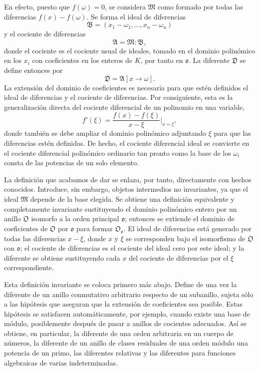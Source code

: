En efecto, puesto que $f(\omega)=0$, se considera $\mathfrak M$ como formado por todas las diferencias $f(x)-f(\omega)$. Se forma el ideal de diferencias
\[
        \mathfrak B=(x_1-\omega_1,\ldots,x_n-\omega_n)
\]
y el cociente de diferencias
\[
        \mathfrak A=\mathfrak M:\mathfrak B,
\]
donde el cociente es el cociente usual de ideales, tomado en el dominio polinómico en los $x_i$ con coeficientes en los enteros de $K$, por tanto en $\mathfrak o$. La diferente $\mathfrak D$ se define entonces por
\[
        \mathfrak D=\mathfrak A[x\to\omega].
\]
La extensión del dominio de coeficientes es necesaria para que estén definidos el ideal de diferencias y el cociente de diferencias. Por consiguiente, esta es la generalización directa del cociente diferencial de un polinomio en una variable,
\[
        f'(\xi)=\frac{f(x)-f(\xi)}{x-\xi}\bigg|_{x=\xi},
\]
donde también se debe ampliar el dominio polinómico adjuntando $\xi$ para que las diferencias estén definidas. De hecho, el cociente diferencial ideal se convierte en el cociente diferencial polinómico ordinario tan pronto como la base de los $\omega_i$ consta de las potencias de un solo elemento.

La definición que acabamos de dar se enlaza, por tanto, directamente con hechos conocidos. Introduce, sin embargo, objetos intermedios no invariantes, ya que el ideal $\mathfrak M$ depende de la base elegida. Se obtiene una definición equivalente y completamente invariante sustituyendo el dominio polinómico entero por un anillo $\mathfrak O$ isomorfo a la orden principal $\mathfrak o$; entonces se extiende el dominio de coeficientes de $\mathfrak O$ por $\mathfrak o$ para formar $\mathfrak O_{\mathfrak o}$. El ideal de diferencias está generado por todas las diferencias $x-\xi$, donde $x$ y $\xi$ se corresponden bajo el isomorfismo de $\mathfrak O$ con $\mathfrak o$; el cociente de diferencias es el cociente del ideal cero por este ideal; y la diferente se obtiene sustituyendo cada $x$ del cociente de diferencias por el $\xi$ correspondiente.

Esta definición invariante se coloca primero más abajo. Define de una vez la diferente de un anillo conmutativo arbitrario respecto de un subanillo, sujeta sólo a las hipótesis que aseguran que la extensión de coeficientes sea posible. Estas hipótesis se satisfacen automáticamente, por ejemplo, cuando existe una base de módulo, posiblemente después de pasar a anillos de cocientes adecuados. Así se obtiene, en particular, la diferente de una orden arbitraria en un cuerpo de números, la diferente de un anillo de clases residuales de una orden módulo una potencia de un primo, las diferentes relativas y las diferentes para funciones algebraicas de varias indeterminadas.

